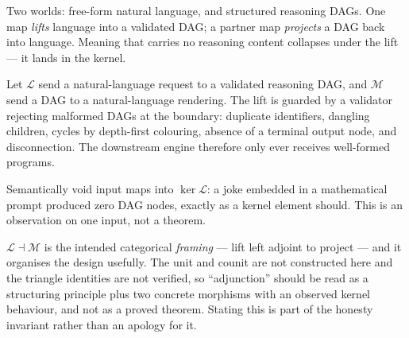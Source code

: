\begin{intu}\Intu
Two worlds: free-form natural language, and structured reasoning DAGs.
One map \emph{lifts} language into a validated DAG; a partner map
\emph{projects} a DAG back into language. Meaning that carries no
reasoning content collapses under the lift --- it lands in the kernel.
\end{intu}

\begin{construction}\label{con:adjunction}
Let $\mathcal L$ send a natural-language request to a validated
reasoning DAG, and $\mathcal M$ send a DAG to a natural-language
rendering. The lift is guarded by a validator rejecting malformed DAGs
at the boundary: duplicate identifiers, dangling children, cycles by
depth-first colouring, absence of a terminal output node, and
disconnection. The downstream engine therefore only ever receives
well-formed programs.
\end{construction}

\begin{remark}
Semantically void input maps into $\ker\mathcal L$: a joke embedded in a
mathematical prompt produced zero DAG nodes, exactly as a kernel element
should. This is an observation on one input, not a theorem.
\end{remark}

\begin{hon}\Hon
$\mathcal L\dashv\mathcal M$ is the intended categorical \emph{framing}
--- lift left adjoint to project --- and it organises the design
usefully. The unit and counit are not constructed here and the triangle
identities are not verified, so ``adjunction'' should be read as a
structuring principle plus two concrete morphisms with an observed
kernel behaviour, and not as a proved theorem. Stating this is part of
the honesty invariant rather than an apology for it.
\end{hon}
